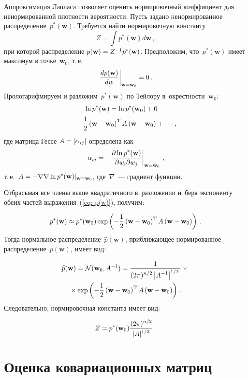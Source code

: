 \begin{multicols}{2}
Аппроксимация Лапласа позволяет оценить нормировочный коэффициент для ненормированной 
плот\-ности вероятности. Пусть задано ненормированное распределение~$p^{*}(\mathbf{w})$. 
Требуется найти нормировочную константу
$$
Z=\int p^{*}\left(\mathbf{w}\right) d\mathbf{w}\,,
$$
при которой распределение $p(\mathbf{w})\hm=Z^{-1}p^{*}(\mathbf{w})$. 
Предположим, что~$p^{*}(\mathbf{w})$ имеет максимум в точке~$\mathbf{w}_0$, т.\,е.\ 
$$
\left. \displaystyle\frac{\displaystyle d p(\mathbf{w})\mathstrut}{\displaystyle d w\mathstrut} \right|_{\mathbf{w}=\mathbf{w}_0}  = 0\,.
$$ 
Прологарифмируем и разложим~$p^{*}(\mathbf{w})$ по Тейлору в~окрестности~$\mathbf{w}_0$:
\begin{multline}
\label {eq: p(w)}
\ln p^{*}(\mathbf{w}) = \ln p^{*}(\mathbf{w}_0) + 0 -{}\\
{}- \displaystyle\frac{\displaystyle 1\mathstrut}{\displaystyle 2\mathstrut}\left(\mathbf{w}-
\mathbf{w}_0\right)^{\mathrm{T}}A\left(\mathbf{w}-\mathbf{w}_0\right) + \cdots\,,
\end{multline}
где матрица Гессе $A\hm=[\alpha_{ij}]$ определена как
$$
\left. \alpha_{ij}=-\displaystyle\frac{\displaystyle \partial \ln p^{*}(\mathbf{w})\mathstrut}{\displaystyle \partial w_{i}
\partial w_{j}\mathstrut} \right|_{\mathbf{w}=\mathbf{w}_0}\,,
$$ 
т.\,е.\ $A\hm=-\nabla\nabla \ln p^{*}(\mathbf{w})|_{\mathbf{w}\hm=\mathbf{w}_0}$, 
где~$\nabla$~--- градиент функции.

Отбрасывая все члены выше квадратичного в~разложении и~беря экспоненту обеих частей 
выражения~(\ref{eq: p(w)}), получим:

\noindent
$$
p^{*}(\mathbf{w})\approx p^{*}(\mathbf{w}_0)\exp \left( 
-\displaystyle\frac{\displaystyle 1\mathstrut}{\displaystyle 2\mathstrut}\left(\mathbf{w}-\mathbf{w}_0\right)^{\mathrm{T}}
A\left(\mathbf{w}-\mathbf{w}_0\right) \right)\,.
$$
Тогда нормальное распределение~$\widehat{p}(\mathbf{w})$, приближающее нормированное 
распределение~$p(\mathbf{w})$, имеет вид:

\noindent
\begin{multline*}
\widehat{p}(\mathbf{w}) = \mathcal{N}(\mathbf{w}_0,A^{-1}) = 
\displaystyle\frac{\displaystyle 1\mathstrut}{\displaystyle (2\pi)^{{n}/{2}}\left\vert A^{-1}\right\vert^{{1}/{2}}\mathstrut}\times{}\\
{}\times
\exp\left( -\displaystyle\frac{\displaystyle 1\mathstrut}{\displaystyle 2\mathstrut}\left(\mathbf{w}-\mathbf{w}_0\right)^{\mathrm{T}}A
\left(\mathbf{w}-\mathbf{w}_0\right) \right)\,.
\end{multline*}
Следовательно, нормировочная константа имеет вид:

\noindent
\begin{equation*}
Z=p^{*}(\mathbf{w}_0)\displaystyle\frac{\displaystyle (2\pi)^{{n}/{2}}\mathstrut}{\displaystyle |A|^{{1}/{2}}\mathstrut}\,.
\end{equation*}


\section{Оценка ковариационных матриц}


\end{multicols}
